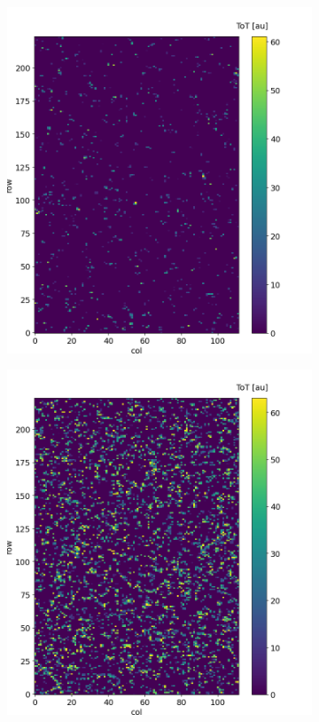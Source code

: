 \begin{figure}
       \begin{subfigure}[b]{0.49\textwidth}
         \centering
         \includegraphics[width=\linewidth]{figures/test_beam/tot_mapq1_17-11.png}    
         \caption{}
         \label{fig:ha}
     \end{subfigure}
     \hfill
     \begin{subfigure}[b]{0.49\textwidth}
         \centering
         \includegraphics[width=\linewidth]{figures/test_beam/tot_mapq2_17-11.png} 

\end{subfigure}
\end{figure}
